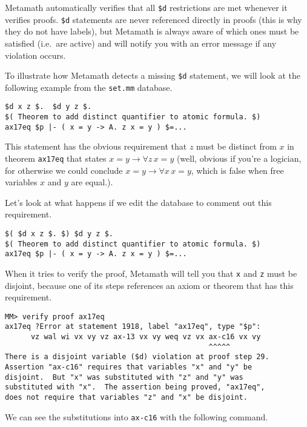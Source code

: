 Metamath automatically verifies that all \texttt{\$d}
restrictions are met whenever it verifies proofs.  \texttt{\$d} statements are
never referenced directly in proofs (this is why they do not have
labels), but Metamath is always aware of which ones must be
satisfied (i.e.\ are active) and will notify you with an error message if any
violation occurs.

To illustrate how Metamath detects a missing \texttt{\$d}
statement, we will look at the following example from the
\texttt{set.mm} database.

\begin{verbatim}
$d x z $.  $d y z $.
$( Theorem to add distinct quantifier to atomic formula. $)
ax17eq $p |- ( x = y -> A. z x = y ) $=...
\end{verbatim}

This statement has the obvious requirement that $z$ must be
distinct from $x$ in theorem \texttt{ax17eq} that
states $x=y \rightarrow \forall z \, x=y$ (well, obvious if you're a logician,
for otherwise we could conclude  $x=y \rightarrow \forall x \, x=y$, which is
false when free variables $x$ and $y$ are equal.).

Let's look at what happens if we edit the database to comment out this
requirement.

\begin{verbatim}
$( $d x z $. $) $d y z $.
$( Theorem to add distinct quantifier to atomic formula. $)
ax17eq $p |- ( x = y -> A. z x = y ) $=...
\end{verbatim}

When it tries to verify the proof, Metamath will tell you that \texttt{x} and
\texttt{z} must be disjoint, because one of its steps references an axiom or
theorem that has this requirement.

\begin{verbatim}
MM> verify proof ax17eq
ax17eq ?Error at statement 1918, label "ax17eq", type "$p":
      vz wal wi vx vy vz ax-13 vx vy weq vz vx ax-c16 vx vy
                                               ^^^^^
There is a disjoint variable ($d) violation at proof step 29.
Assertion "ax-c16" requires that variables "x" and "y" be
disjoint.  But "x" was substituted with "z" and "y" was
substituted with "x".  The assertion being proved, "ax17eq",
does not require that variables "z" and "x" be disjoint.
\end{verbatim}

We can see the substitutions into \texttt{ax-c16} with the following command.

